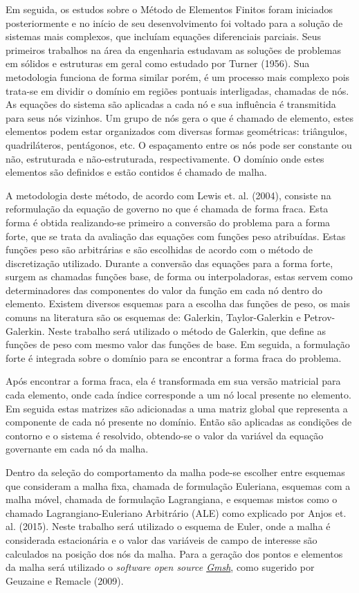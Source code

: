 Em seguida, os estudos sobre o Método de Elementos Finitos foram iniciados posteriormente e no início de seu desenvolvimento foi voltado para a solução de sistemas mais complexos, que incluíam equações diferenciais parciais.
Seus primeiros trabalhos na área da engenharia estudavam as soluções de problemas em sólidos e estruturas em geral como estudado por Turner (1956)\cite{Turner-1956}.
Sua metodologia funciona de forma similar porém, é um processo mais complexo pois trata-se em dividir o domínio em regiões pontuais interligadas, chamadas de nós.
As equações do sistema são aplicadas a cada nó e sua influência é transmitida para seus nós vizinhos.
Um grupo de nós gera o que é chamado de elemento, estes elementos podem estar organizados com diversas formas geométricas: triângulos, quadriláteros, pentágonos, etc.
O espaçamento entre os nós pode ser constante ou não, estruturada e não-estruturada, respectivamente.
O domínio onde estes elementos são definidos e estão contidos é chamado de malha.

A metodologia deste método, de acordo com Lewis et. al. (2004)\cite{lewis}, consiste na reformulação da equação de governo no que é chamada de forma fraca.
Esta forma é obtida realizando-se primeiro a conversão do problema para a forma forte, que se trata da avaliação das equações com funções peso atribuídas.
Estas funções peso são arbitrárias e são escolhidas de acordo com o método de discretização utilizado.
Durante a conversão das equações para a forma forte, surgem as chamadas funções base, de forma ou interpoladoras, estas servem como determinadores das componentes do valor da função em cada nó dentro do elemento.
Existem diversos esquemas para a escolha das funções de peso, os mais comuns na literatura são os esquemas de: Galerkin, Taylor-Galerkin e Petrov-Galerkin.
Neste trabalho será utilizado o método de Galerkin, que define as funções de peso com mesmo valor das funções de base.
Em seguida, a formulação forte é integrada sobre o domínio para se encontrar a forma fraca do problema.

Após encontrar a forma fraca, ela é transformada em sua versão matricial para cada elemento, onde cada índice corresponde a um nó local presente no elemento.
Em seguida estas matrizes são adicionadas a uma matriz global que representa a componente de cada nó presente no domínio.
Então são aplicadas as condições de contorno e o sistema é resolvido, obtendo-se o valor da variável da equação governante em cada nó da malha.

Dentro da seleção do comportamento da malha pode-se escolher entre esquemas que consideram a malha fixa, chamada de formulação Euleriana, esquemas com a malha móvel, chamada de formulação Lagrangiana, e esquemas mistos como o chamado Lagrangiano-Euleriano Arbitrário (ALE) como explicado por Anjos et. al. (2015)\cite{ALE-2015}.
Neste trabalho será utilizado o esquema de Euler, onde a malha é considerada estacionária e o valor das variáveis de campo de interesse são calculados na posição dos nós da malha.
Para a geração dos pontos e elementos da malha será utilizado o \textit{software open source \href{http://gmsh.info}{Gmsh}}, como sugerido por Geuzaine e Remacle (2009)\cite{gmsh}.


